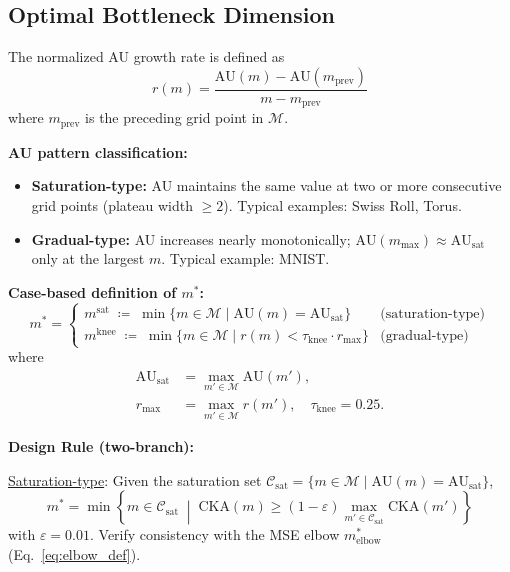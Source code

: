 \documentclass[12pt,a4paper]{article}
\newcommand{\dzopt}{m^*}
\newcommand{\AUsat}{\mathrm{AU}_{\mathrm{sat}}}
\newcommand{\dzsat}{m^{\mathrm{sat}}}
\newcommand{\mknee}{m^{\mathrm{knee}}}
\begin{document}
\subsection{Optimal Bottleneck Dimension}

The normalized AU growth rate is defined as
\begin{equation}
  r(m) = \frac{\mathrm{AU}(m) - \mathrm{AU}(m_{\mathrm{prev}})}{m - m_{\mathrm{prev}}}
  \label{eq:au_rate}
\end{equation}
where $m_{\mathrm{prev}}$ is the preceding grid point in $\mathcal{M}$.

\textbf{AU pattern classification:}
\begin{itemize}
  \item \textbf{Saturation-type:} AU maintains the same value at two or more consecutive grid points (plateau width $\geq 2$). Typical examples: Swiss Roll, Torus.
  \item \textbf{Gradual-type:} AU increases nearly monotonically; $\mathrm{AU}(m_{\max}) \approx \AUsat$ only at the largest $m$. Typical example: MNIST.
\end{itemize}

\textbf{Case-based definition of $m^*$:}
\begin{equation}
  \dzopt =
  \begin{cases}
    \dzsat \;\coloneqq\; \min\bigl\{m \in \mathcal{M} \;\big|\; \mathrm{AU}(m) = \AUsat\bigr\}
      & \text{(saturation-type)} \\[4pt]
    \mknee \;\coloneqq\; \min\bigl\{m \in \mathcal{M} \;\big|\; r(m) < \tau_{\mathrm{knee}}\cdot r_{\max}\bigr\}
      & \text{(gradual-type)}
  \end{cases}
  \label{eq:dzopt}
\end{equation}
where
\begin{align}
  \AUsat &= \max_{m' \in \mathcal{M}} \mathrm{AU}(m'), \label{eq:dzopt_sat} \\
  r_{\max} &= \max_{m' \in \mathcal{M}} r(m'), \quad
  \tau_{\mathrm{knee}} = 0.25. \label{eq:dzopt_knee}
\end{align}

\textbf{Design Rule (two-branch):}

\noindent\underline{Saturation-type}: Given the saturation set $\mathcal{C}_\mathrm{sat} = \{m \in \mathcal{M} \mid \mathrm{AU}(m) = \AUsat\}$,
\begin{equation}
  \dzopt = \min\!\left\{m \in \mathcal{C}_{\mathrm{sat}}
  \;\middle|\;
  \mathrm{CKA}(m) \geq (1-\varepsilon)\max_{m'\in\mathcal{C}_{\mathrm{sat}}}\mathrm{CKA}(m')
  \right\}
  \label{eq:dzopt_cka}
\end{equation}
with $\varepsilon = 0.01$. Verify consistency with the MSE elbow $m^*_\mathrm{elbow}$ (Eq.~\eqref{eq:elbow_def}).
\end{document}
